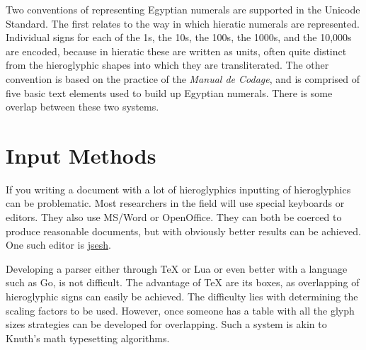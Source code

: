 Two conventions of representing Egyptian numerals are supported in the Unicode Standard.
The first relates to the way in which hieratic numerals are represented. Individual
signs for each of the 1s, the 10s, the 100s, the 1000s, and the 10,000s are encoded, because in
hieratic these are written as units, often quite distinct from the hieroglyphic shapes into
which they are transliterated. The other convention is based on the practice of the \emph{Manual
de Codage}, and is comprised of five basic text elements used to build up Egyptian numerals.
There is some overlap between these two systems.

%

\section{Input Methods}

If you writing a document with a lot of hieroglyphics inputting of hieroglyphics can be problematic. Most researchers in the field will use special keyboards or editors. They also use MS/Word or OpenOffice. They can both be coerced to produce reasonable documents, but with \tex obviously better results can be achieved. One such editor is \href{http://jsesh.qenherkhopeshef.org/}{jsesh}. 

Developing a parser either through TeX or Lua or even better with a language such as Go, is not difficult. The advantage of TeX are its boxes, as overlapping of hieroglyphic signs can easily be achieved. The difficulty lies with determining the scaling factors to be used. However, once someone has a table with all the glyph sizes strategies can be developed for overlapping. Such a system is akin to Knuth's math typesetting algorithms. 

